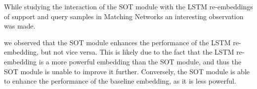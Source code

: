 While studying the interaction of the SOT module with the LSTM re-embeddings of support and query samples in Matching Networks an interesting observation was made. 

we observed that the SOT module enhances the performance of the LSTM re-embedding, but not vice versa. This is likely due to the fact that the LSTM re-embedding is a more powerful embedding than the SOT module, and thus the SOT module is unable to improve it further. Conversely, the SOT module is able to enhance the performance of the baseline embedding, as it is less powerful.

